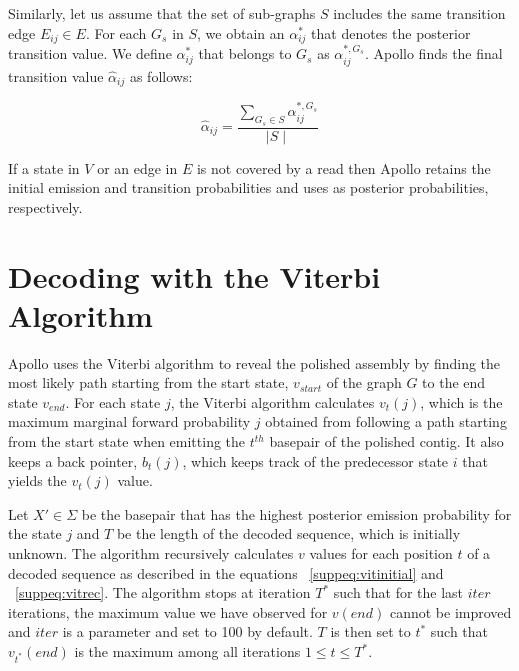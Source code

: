 \documentclass[a4paper]{article}
\begin{document}
Similarly, let us assume that the set of sub-graphs $S$ includes the same transition edge $E_{ij} \in E$.  For each $G_{s}$ in $S$, we obtain an $\alpha^{*}_{ij}$ that denotes the posterior transition value. We define $\alpha^{*}_{ij}$ that belongs to $G_{s}$ as $\alpha^{*,G_{s}}_{ij}$. Apollo finds the final transition value $\hat{\alpha}_{ij}$ as follows: 

\begin{equation}
\hat{\alpha}_{ij} = \dfrac{\sum\limits_{G_{s} \in S} \alpha^{*,G_{s}}_{ij}}{\mid S \mid}
\tag{S7} \label{suppeq:transitioncapupd} 
\end{equation}

If a state in $V$ or an edge in $E$ is not covered by a read then Apollo retains the initial emission and transition probabilities and uses as posterior probabilities, respectively.

\section{Decoding with the Viterbi Algorithm}\label{suppsec:decoding}

Apollo uses the Viterbi algorithm to reveal the polished assembly by finding the most likely path starting from the start state, $v_{start}$ of the graph $G$ to the end state $v_{end}$. For each state $j$, the Viterbi algorithm calculates $v_{t}(j)$, which is the maximum marginal forward probability $j$ obtained from following a path starting from the start state when emitting the $t^{th}$ basepair of the polished contig. It also keeps a back pointer, $b_{t}(j)$, which keeps track of the predecessor state $i$ that yields the $v_{t}(j)$ value.

Let $X' \in \Sigma$ be the basepair that has the highest posterior emission probability for the state $j$ and $T$ be the length of the decoded sequence, which is initially unknown. The algorithm recursively calculates $v$ values for each position $t$ of a decoded sequence as described in the equations ~\ref{suppeq:vitinitial} and ~\ref{suppeq:vitrec}. The algorithm stops at iteration $T^{*}$ such that for the last $iter$ iterations, the maximum value we have observed for $v(end)$ cannot be improved and $iter$ is a parameter and set to 100 by default. $T$ is then set to $t^{*}$ such that $v_{t^{*}}(end)$ is the maximum among all iterations $1 \leq t \leq T^{*} $.
\end{document}
